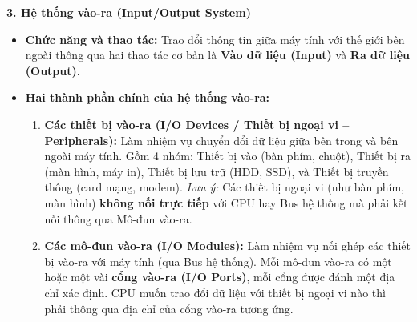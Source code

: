 \textbf{3. Hệ thống vào-ra (Input/Output System)}
\begin{itemize}
    \item \textbf{Chức năng và thao tác:} Trao đổi thông tin giữa máy tính với thế giới bên ngoài thông qua hai thao tác cơ bản là \textbf{Vào dữ liệu (Input)} và \textbf{Ra dữ liệu (Output)}.
    \item \textbf{Hai thành phần chính của hệ thống vào-ra:}
    \begin{enumerate}
        \item \textbf{Các thiết bị vào-ra (I/O Devices / Thiết bị ngoại vi -- Peripherals):} Làm nhiệm vụ chuyển đổi dữ liệu giữa bên trong và bên ngoài máy tính. Gồm 4 nhóm: Thiết bị vào (bàn phím, chuột), Thiết bị ra (màn hình, máy in), Thiết bị lưu trữ (HDD, SSD), và Thiết bị truyền thông (card mạng, modem). \textit{Lưu ý:} Các thiết bị ngoại vi (như bàn phím, màn hình) \textbf{không nối trực tiếp} với CPU hay Bus hệ thống mà phải kết nối thông qua Mô-đun vào-ra.
        \item \textbf{Các mô-đun vào-ra (I/O Modules):} Làm nhiệm vụ nối ghép các thiết bị vào-ra với máy tính (qua Bus hệ thống). Mỗi mô-đun vào-ra có một hoặc một vài \textbf{cổng vào-ra (I/O Ports)}, mỗi cổng được đánh một địa chỉ xác định. CPU muốn trao đổi dữ liệu với thiết bị ngoại vi nào thì phải thông qua địa chỉ của cổng vào-ra tương ứng.
    \end{enumerate}
\end{itemize}

